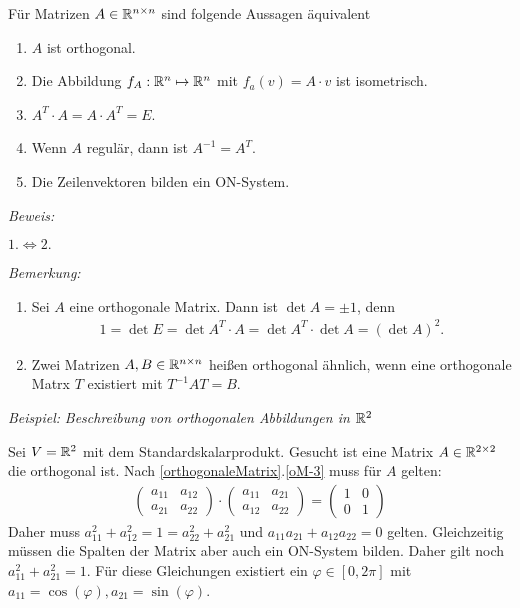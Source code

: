 \begin{mysatz}\label{orthogonaleMatrix}
    Für Matrizen $A\in \mathbb{R}^{n \times n}$ sind folgende Aussagen äquivalent
    \begin{enumerate}
        \item $A$ ist orthogonal.
        \item Die Abbildung $f_A : \mathbb{R}^n \mapsto \mathbb{R}^n$ mit $f_a(v) = A \cdot v$ ist isometrisch.
        \item \label{oM-3} $A^T \cdot A = A \cdot A^T = E$.
        \item Wenn $A$ regulär, dann ist $A^{-1} = A^T$.
        \item Die Zeilenvektoren bilden ein ON-System.
    \end{enumerate}

    \textit{Beweis:}\medskip

    $1.\Leftrightarrow 2.$
\end{mysatz}


\textit{Bemerkung:}
\begin{enumerate}
    \item Sei $A$ eine orthogonale Matrix. Dann ist $\det A = \pm 1$, denn
        \begin{align*}
            1 = \det E = \det A^T \cdot A = \det A^T \cdot \det A = (\det A)^2.
        \end{align*}
    \item Zwei Matrizen $A, B \in \mathbb{R}^{n \times n}$ heißen orthogonal ähnlich, wenn eine orthogonale Matrx $T$ existiert mit $T^{-1} A T = B$.
\end{enumerate}



\textit{Beispiel:}
\textit{Beschreibung von orthogonalen Abbildungen in $\mathbb{R}^2$}\medskip

Sei $V = \mathbb{R}^2$ mit dem Standardskalarprodukt.
Gesucht ist eine Matrix $A \in \mathbb{R}^{2\times 2}$ die orthogonal ist. Nach \ref{orthogonaleMatrix}.\ref{oM-3} muss für $A$ gelten:
\begin{align*}
    \begin{pmatrix}
        a_{11} & a_{12}\\
        a_{21} & a_{22}
    \end{pmatrix}
    \cdot
    \begin{pmatrix}
        a_{11} & a_{21}\\
        a_{12} & a_{22}
    \end{pmatrix}
    =
    \begin{pmatrix}
        1 & 0\\
        0 & 1
    \end{pmatrix}
\end{align*}
Daher muss $a_{11}^2 + a_{12}^2 = 1 = a_{22}^2 + a_{21}^2$ und $a_{11} a_{21} + a_{12} a_{22} = 0$ gelten.
Gleichzeitig müssen die Spalten der Matrix aber auch ein ON-System bilden.
Daher gilt noch $a_{11}^2 + a_{21}^2 = 1$.
Für diese Gleichungen existiert ein $\varphi \in [0 , 2 \pi]$ mit $a_{11} = \cos(\varphi), a_{21} = \sin(\varphi)$.\medskip

